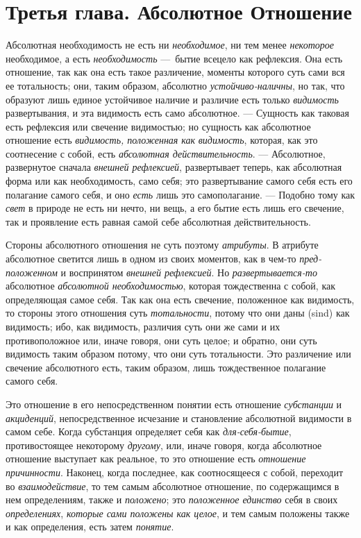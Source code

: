 \chapter[{\em Третья глава} Абсолютное Отношение]{Третья глава. Абсолютное Отношение}

Абсолютная необходимость не есть ни
{\em необходимое}, ни тем менее
{\em некоторое} необходимое, а есть
{\em необходимость} —~бытие всецело как рефлексия. Она
есть отношение, так как она есть такое различение, моменты которого суть
сами вся ее тотальность; они, таким образом, абсолютно
{\em устойчиво-наличны}, но так, что образуют лишь
единое устойчивое наличие и различие есть только
{\em видимость} развертывания, и эта видимость есть
само абсолютное. — Сущность как таковая есть рефлексия или свечение
видимостью; но сущность как абсолютное отношение есть
{\em видимость, положенная как
}{\em видимость}, которая, как это соотнесение с собой,
есть {\em абсолютная действительность}. — Абсолютное,
развернутое сначала {\em внешней рефлексией},
развертывает теперь, как абсолютная форма или как необходимость, само себя;
это развертывание самого себя есть его полагание самого себя, и оно
{\em есть} лишь это самополагание. — Подобно тому как
{\em свет} в природе не есть ни нечто, ни вещь, а его
бытие есть лишь его свечение, так и проявление есть равная самой себе
абсолютная действительность.

Стороны абсолютного отношения не суть поэтому
{\em атрибуты}. В атрибуте абсолютное светится лишь в
одном из своих моментов, как в чем-то
{\em пред-положенном} и воспринятом
{\em внешней рефлексией}. Но
{\em развертывается-то} абсолютное
{\em абсолютной необходимостью}, которая тождественна с
собой, как определяющая самое себя. Так как она есть свечение, положенное
как видимость, то стороны этого отношения суть
{\em тотальности}, потому что они даны (sind) как
видимость; ибо, как видимость, различия суть они же сами и их
противоположное или, иначе говоря, они суть целое; и обратно, они суть
видимость таким образом потому, что они суть тотальности. Это различение
или свечение абсолютного есть, таким образом, лишь тождественное полагание
самого себя.

Это отношение в его непосредственном понятии есть отношение
{\em субстанции} и
{\em акциденций}, непосредственное исчезание и
становление абсолютной видимости в самом себе. Когда субстанция определяет
себя как {\em для-себя-бытие}, противостоящее
некоторому {\em другому}, или, иначе говоря, когда
абсолютное отношение выступает как реальное, то это отношение есть
{\em отношение причинности}. Наконец, когда последнее,
как соотносящееся с собой, переходит во
{\em взаимодействие}, то тем самым абсолютное
отношение, по содержащимся в нем определениям, также и
{\em положено}; это {\em положенное
единство} себя в своих {\em определениях},
{\em которые сами положены как целое}, и тем самым
положены также и как определения, есть затем
{\em понятие}.


